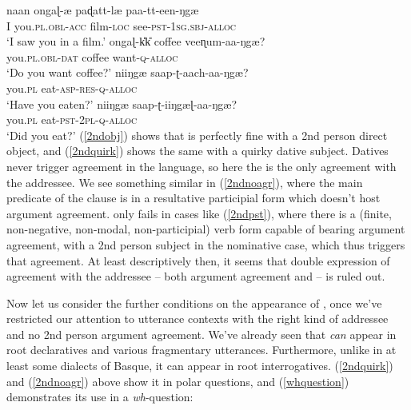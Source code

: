 \documentclass[output=paper, modfonts, nonflat]{langsci/langscibook}
\begin{document}
\ea\label{2ndarg}
  \ea
    \label{2ndobj}\gll naan ongaɭ-æ{} paɖatt-læ{} paa-tt-een-ŋgæ\\
    I you.\textsc{pl}.\textsc{obl}-\textsc{acc}{} film-\textsc{loc}{} see-\textsc{pst}-1\textsc{sg}.\textsc{sbj}-\textsc{alloc}\\
    \glt `I saw you in a film.'
  \ex
    \label{2ndquirk}\gll ongaɭ-\U kk\U{} coffee veeɳum-aa-ŋgæ?\\
    you.\textsc{pl}.\textsc{obl}-\textsc{dat}{} coffee want-\textsc{q}-\textsc{alloc}\\
    \glt `Do you want coffee?'
  \ex
    \label{2ndnoagr}\gll niiŋgæ{} saap-ʈ-aach-aa-ŋgæ?\\
    you.\textsc{pl}{} eat-\textsc{asp}-\textsc{res}-\textsc{q}-\textsc{alloc}\\
    \glt `Have you eaten?'
  \ex
    \label{2ndpst}\gll *niiŋgæ{} saap-ʈ-iiŋgæɭ-aa-ŋgæ?\\
    you.\textsc{pl}{} eat-\textsc{pst}-2\textsc{pl}-\textsc{q}-\textsc{alloc}\\
    \glt `Did you eat?'
  \z
\z
%
(\ref{2ndobj}) shows that \allagr{} is perfectly fine with a 2nd
person direct object, and (\ref{2ndquirk}) shows the same with a
quirky dative subject. Datives never trigger agreement in the
language, so here the \allagr{} is the only agreement with the
addressee. We see something similar in (\ref{2ndnoagr}), where the
main predicate of the clause is in a resultative participial form
which doesn't host argument agreement. \allagr{} only fails in cases
like (\ref{2ndpst}), where there is a (finite, non-negative,
non-modal, non-participial) verb form capable of bearing argument
agreement, with a 2nd person subject in the nominative case, which
thus triggers that agreement. At least descriptively then, it seems
that double expression of agreement with the addressee -- both
argument agreement and \allagr{} -- is ruled out.%


Now let us consider the further conditions on the appearance of
\allagr, once we've restricted our attention to utterance contexts
with the right kind of addressee and no 2nd person argument agreement.
We've already seen that \allagr{} \emph{can} appear in root
declaratives and various fragmentary utterances. Furthermore, unlike
in at least some dialects of Basque, it can appear in root
interrogatives. (\ref{2ndquirk}) and (\ref{2ndnoagr}) above show it in
polar questions, and (\ref{whquestion}) demonstrates its use in a
\textit{wh}-question:
\end{document}
